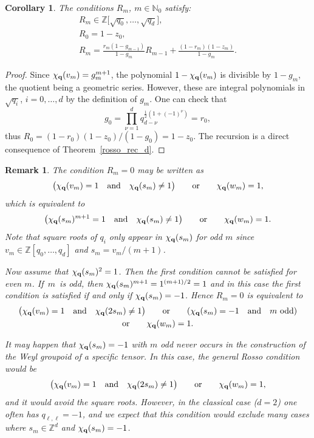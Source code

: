 \documentclass[pdftex]{sigma}
\numberwithin{equation}{section}
\newtheorem{Corollary}[Theorem]{Corollary}
\newtheorem{Remark}[Theorem]{Remark}
\newcommand{\NN }{\mathbb{N}}
\newcommand{\ZZ }{\mathbb{Z}}
\newcommand{\qq }{{\bf q}}
\newcommand{\dn }{d}
\newcommand{\bich }{\chi}
\begin{document}
\begin{Corollary} The conditions $R_m$, $m\in\NN_0$ satisfy:
\begin{gather*}%
R_m \in   \ZZ\big[\sqrt{q_0},\dots,\sqrt{q_d}\big],\nonumber\\
R_0 =  1-z_0, \nonumber\\
R_m =  \frac{r_m(1-g_{m-1})}{1-g_m} R_{m-1} + \frac{(1-r_m)(1-z_m)}{1-g_m}.
\end{gather*}
\end{Corollary}

\begin{proof}
Since $\chi_\qq(v_m)=g_m^{m+1}$, the polynomial $1-\chi_\qq(v_m)$ is divisible by $1-g_m$, the quotient being a geometric series. However, these are integral polynomials in $\sqrt{q_i}$, $i=0,\dots,d$ by the definition of $g_m$.
One can check that
\[g_0=\prod_{\nu=1}^d q_{\dn-\nu}^{\frac{1}{2}(1+(-1)^\nu)}=r_0,
\]
thus
$R_0 = (1-r_0)(1-z_0)/(1-g_0)=1-z_0$.
The recursion is a direct consequence of Theo\-rem~\ref{rosso_rec_d}.
\end{proof}

\begin{Remark}The condition $R_m=0$ may be written as
\begin{gather*}
\big(\bich_\qq(v_m)=1 \quad \text{and}\quad \bich_\qq(s_m)\ne 1\big)
\qquad \text{or} \qquad
\bich_\qq(w_m)=1,
\end{gather*}
which is equivalent to
\begin{gather*}
\big(\bich_\qq(s_m)^{m+1}=1 \quad \text{and}\quad \bich_\qq(s_m)\ne 1\big)
\qquad \text{or} \qquad
\bich_\qq(w_m)=1.
\end{gather*}
Note that square roots of $q_i$ only appear in $\bich_\qq(s_m)$ for odd $m$ since $v_m\in\ZZ[q_0,\dots,q_\dn]$ and $s_m=v_m/(m+1)$.

Now assume that $\bich_\qq(s_m)^2=1$. Then the first condition cannot be satisfied for even $m$.
If~$m$~is odd,
then $\bich_\qq(s_m)^{m+1}=1^{(m+1)/2}=1$ and in this case the first condition is satisfied if and only if $\bich_\qq(s_m)=-1$. Hence $R_m=0$ is equivalent to
\begin{gather*}
\big(\bich_\qq(v_m)=1 \quad\text{and} \quad\bich_\qq(2s_m)\ne 1\big)
\qquad \text{or} \qquad
(\bich_\qq(s_m)=-1 \quad \text{and}\quad m \text{ odd})\nonumber \\
\text{or} \qquad
\bich_\qq(w_m)=1.
\end{gather*}

It may happen that $\bich_\qq(s_m)=-1$ with $m$ odd never occurs in the construction of the Weyl groupoid of a specific tensor. In this case, the general Rosso condition would be
\begin{gather*}
\big(\bich_\qq(v_m)=1 \quad \text{and}\quad \bich_\qq(2s_m)\ne 1\big)
\qquad \text{or} \qquad
\bich_\qq(w_m)=1,
\end{gather*}
and it would avoid the square roots.
However, in the classical case ($d=2$) one often has $q_{\ell,\ell}=-1$, and we expect that this
condition would exclude many cases where $s_m\in\ZZ^d$ and $\bich_\qq(s_m)=-1$.
\end{Remark}
\end{document}
